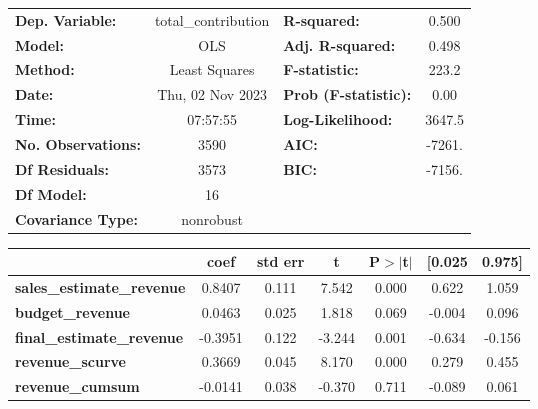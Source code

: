 \begin{center}
\begin{tabular}{lclc}
\toprule
\textbf{Dep. Variable:}                & total\_contribution & \textbf{  R-squared:         } &     0.500   \\
\textbf{Model:}                        &         OLS         & \textbf{  Adj. R-squared:    } &     0.498   \\
\textbf{Method:}                       &    Least Squares    & \textbf{  F-statistic:       } &     223.2   \\
\textbf{Date:}                         &   Thu, 02 Nov 2023  & \textbf{  Prob (F-statistic):} &     0.00    \\
\textbf{Time:}                         &       07:57:55      & \textbf{  Log-Likelihood:    } &    3647.5   \\
\textbf{No. Observations:}             &          3590       & \textbf{  AIC:               } &    -7261.   \\
\textbf{Df Residuals:}                 &          3573       & \textbf{  BIC:               } &    -7156.   \\
\textbf{Df Model:}                     &            16       & \textbf{                     } &             \\
\textbf{Covariance Type:}              &      nonrobust      & \textbf{                     } &             \\
\bottomrule
\end{tabular}
\begin{tabular}{lcccccc}
                                       & \textbf{coef} & \textbf{std err} & \textbf{t} & \textbf{P$> |$t$|$} & \textbf{[0.025} & \textbf{0.975]}  \\
\midrule
\textbf{sales\_estimate\_revenue}      &       0.8407  &        0.111     &     7.542  &         0.000        &        0.622    &        1.059     \\
\textbf{budget\_revenue}               &       0.0463  &        0.025     &     1.818  &         0.069        &       -0.004    &        0.096     \\
\textbf{final\_estimate\_revenue}      &      -0.3951  &        0.122     &    -3.244  &         0.001        &       -0.634    &       -0.156     \\
\textbf{revenue\_scurve}               &       0.3669  &        0.045     &     8.170  &         0.000        &        0.279    &        0.455     \\
\textbf{revenue\_cumsum}               &      -0.0141  &        0.038     &    -0.370  &         0.711        &       -0.089    &        0.061     \\

\end{tabular}
\end{center}
